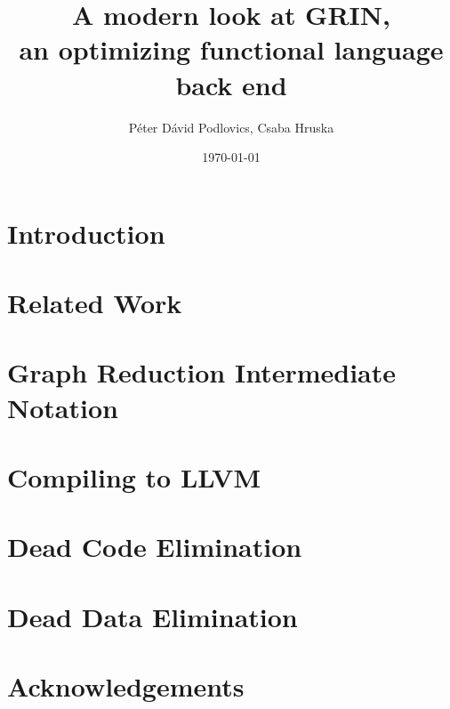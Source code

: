 \documentclass[10pt,a4paper,oneside]{article}
\title{\vspace{-2cm}A modern look at GRIN,\\ an optimizing functional language back end}
\date{\today}
\author{Péter Dávid Podlovics, Csaba Hruska}
\begin{document}
	
	\maketitle
	
	
	\section{Introduction} \label{sec-intro}
	
	
	\section{Related Work}
	
	
	\section{Graph Reduction Intermediate Notation}
	
	
	\section{Compiling to LLVM}
	
	
	\section{Dead Code Elimination}
	
	
	\section{Dead Data Elimination}
	
	
	
	
	\section*{Acknowledgements}
	
	
	

	
\end{document}
